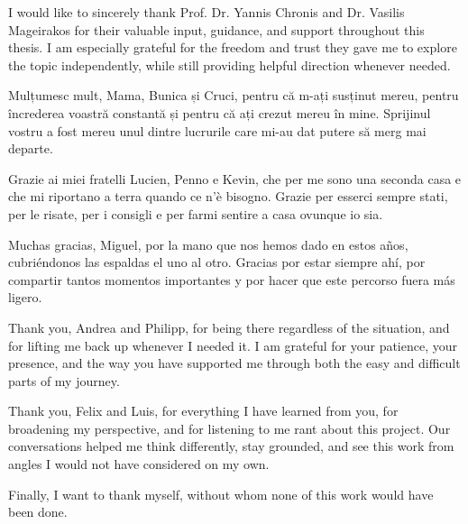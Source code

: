 \begin{acknowledgements}
I would like to sincerely thank Prof. Dr. Yannis Chronis and Dr. Vasilis Mageirakos for their valuable input, guidance, and support throughout this thesis. I am especially grateful for the freedom and trust they gave me to explore the topic independently, while still providing helpful direction whenever needed.

Mulțumesc mult, Mama, Bunica și Cruci, pentru că m-ați susținut mereu, pentru încrederea voastră constantă și pentru că ați crezut mereu în mine. Sprijinul vostru a fost mereu unul dintre lucrurile care mi-au dat putere să merg mai departe.

Grazie ai miei fratelli Lucien, Penno e Kevin, che per me sono una seconda casa e che mi riportano a terra quando ce n'è bisogno. Grazie per esserci sempre stati, per le risate, per i consigli e per farmi sentire a casa ovunque io sia.

Muchas gracias, Miguel, por la mano que nos hemos dado en estos años, cubriéndonos las espaldas el uno al otro. Gracias por estar siempre ahí, por compartir tantos momentos importantes y por hacer que este percorso fuera más ligero.

Thank you, Andrea and Philipp, for being there regardless of the situation, and for lifting me back up whenever I needed it. I am grateful for your patience, your presence, and the way you have supported me through both the easy and difficult parts of my journey.

Thank you, Felix and Luis, for everything I have learned from you, for broadening my perspective, and for listening to me rant about this project. Our conversations helped me think differently, stay grounded, and see this work from angles I would not have considered on my own.

Finally, I want to thank myself, without whom none of this work would have been done.
\end{acknowledgements}

